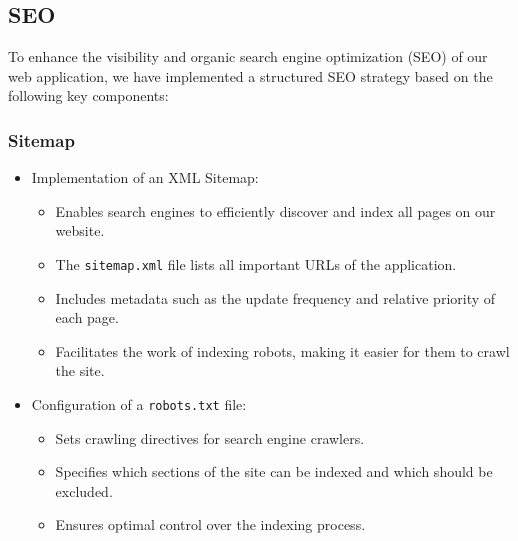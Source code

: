 \subsection{SEO}

To enhance the visibility and organic search engine optimization (SEO) of our web application, we have implemented a structured SEO strategy based on the following key components:

\subsubsection{Sitemap}
\begin{itemize}
    \item Implementation of an XML Sitemap:

    \begin{itemize}
        \item Enables search engines to efficiently discover and index all pages on our website.
        \item The \texttt{sitemap.xml} file lists all important URLs of the application.
        \item Includes metadata such as the update frequency and relative priority of each page.
        \item Facilitates the work of indexing robots, making it easier for them to crawl the site.
    \end{itemize}

    \item Configuration of a \texttt{robots.txt} file:

        \begin{itemize}
            \item Sets crawling directives for search engine crawlers.
            \item Specifies which sections of the site can be indexed and which should be excluded.
            \item Ensures optimal control over the indexing process.
        \end{itemize}

\end{itemize}

